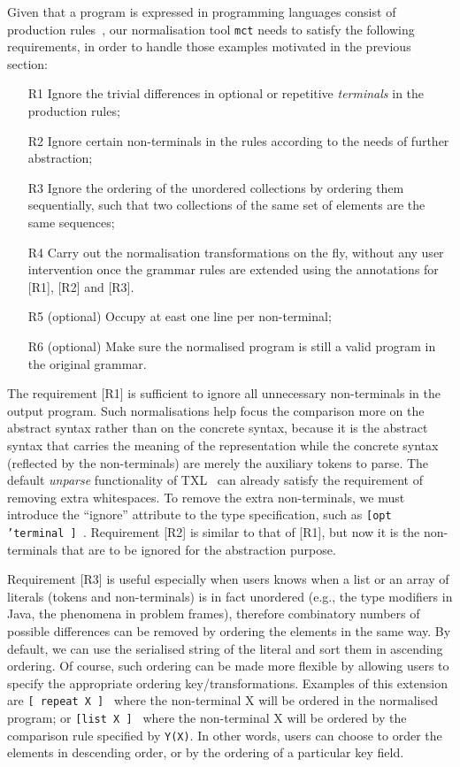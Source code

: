 \documentclass[10pt, conference, compsocconf]{IEEEtran}
\begin{document}
Given that a program is expressed in programming languages consist of production rules~\cite{aho79}, our normalisation tool {\tt mct} needs to satisfy the following requirements, in order to handle those examples motivated in the previous section:
\begin{enumerate}
\item [R1] Ignore the trivial differences in optional or repetitive {\em terminals} in the production rules;
\item [R2] Ignore certain non-terminals in the rules according to the needs of further abstraction;
\item [R3] Ignore the ordering of the unordered collections by ordering them sequentially, such that two collections of the same set of elements are the same sequences;
\item [R4] Carry out the normalisation transformations on the fly, without any user intervention once the grammar rules are extended using the annotations for [R1], [R2] and [R3].
\item [R5] (optional) Occupy at east one line per non-terminal;
\item [R6] (optional) Make sure the normalised program is still a valid program in the original grammar.
\end{enumerate}

The requirement [R1] is sufficient to ignore all unnecessary non-terminals in the output program. Such normalisations help focus the comparison more on the abstract syntax rather than on the concrete syntax, because it is the abstract syntax that carries the meaning of the representation while the concrete syntax (reflected by the non-terminals) are merely the auxiliary tokens to parse. The default {\em unparse} functionality of TXL~\cite{txl} can already satisfy the requirement of removing extra whitespaces. To remove the extra non-terminals, we must introduce the ``ignore'' attribute to the type specification, such as {\tt [opt 'terminal ] }. Requirement [R2] is similar to that of [R1], but now it is the non-terminals that are to be ignored for the abstraction purpose. 

Requirement [R3] is useful especially when users knows when a list or an array of literals (tokens and non-terminals) is in fact unordered (e.g., the type modifiers in Java, the phenomena in problem frames), therefore combinatory numbers of possible differences can be removed by ordering the elements in the same way. By default, we can use the serialised string of the literal and sort them in ascending ordering. Of course, such ordering can be made more flexible by allowing users to specify the appropriate ordering key/transformations. Examples of this extension are {\tt [ repeat X  ] } where the non-terminal X will be ordered in the normalised program; or {\tt [list X ] } where the non-terminal X will be ordered by the comparison rule specified by {\tt Y(X)}. In other words, users can choose to order the elements in descending order, or by the ordering of a particular key field. 
\end{document}
